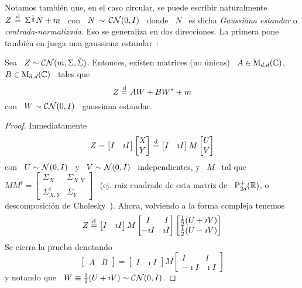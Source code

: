 Notamos tambi\'en que, en el caso  circular, se puede escribir naturalmente \ $Z
\, \stackrel{\mathrm{d}}{=} \, \Sigma^{\frac12} N + m$ \  con \ $N \, \sim \, \mathcal{CN}(0,I)$ \ donde \
$N$ \  es dicha  {\em Gaussiana estandar}  o {\em centrada-normalizada}.   Eso se
generaliza en dos direcciones.  La  primera pone tambi\'en en juega una gaussiana
estandar~\cite{Lap17}:
%
\begin{teorema}
\label{Teo:MP:GaussianaComplejaWWestrella}
%
Sea \  $Z \sim  \mathcal{CN}(m,\Sigma,\check{\Sigma})$.  Entonces, existen  matrices (no
\'unicas) \ $A \in \mathrm{M}_{d,d}(\mathbb{C})$, \ $B \in \mathrm{M}_{d,d}(\mathbb{C})$ \ tales que
  \[
  Z \stackrel{\mathrm{d}}{=} A W + B W^* + m
  \]
  con \ $W \sim \mathcal{CN}(0,I)$ \ gaussiana estandar.
\end{teorema}
\begin{proof}
  Inmediatamente
  \[
  Z   =  \begin{bmatrix}   I   &  \imath   I\end{bmatrix}  \begin{bmatrix}   X\\
    Y\end{bmatrix}
  \stackrel{\mathrm{d}}{=} \begin{bmatrix} I & \imath I\end{bmatrix} M \begin{bmatrix} U\\
    V\end{bmatrix}
  \]
  con \ $U \sim \mathcal{N}(0,I)$ \ y \  $V \sim \mathcal{N}(0,I)$ \ independientes, y \ $M$ \ tal
  que  \ $M  M^t =  \begin{bmatrix} \Sigma_X  & \Sigma_{X,Y}  \\  \Sigma_{X,Y}^t &
    \Sigma_Y  \end{bmatrix}$  \   (ej.  raiz  cuadrade  de  esta   matriz  de  \
  $\mathrm{P}_{2d}^+(\mathbb{R})$,    o     descomposici\'on    de    Cholesky~\cite{HorJoh13,
    Bha07}). Ahora, volviendo a la forma compleja tenemos
  \[
  Z     \stackrel{\mathrm{d}}{=}   \begin{bmatrix}    I   &   \imath   I\end{bmatrix}
  M \begin{bmatrix} I  & I\\ -\imath I &  \imath I \end{bmatrix} \begin{bmatrix}
    \frac12 (U + \imath V)\\ \frac12 (U - \imath V)\end{bmatrix}
  \]
  Se cierra la prueba denotando
  \[
  \begin{bmatrix}   A   &   B\end{bmatrix}   =  \begin{bmatrix} I &
    \imath  I\end{bmatrix}  M  \begin{bmatrix}  I  &  I\\  -\imath  I  &  \imath
    I \end{bmatrix}
  \]
  y notando que \ $W \equiv \frac12 (U + \imath V) \sim \mathcal{CN}(0,I)$.
\end{proof}
